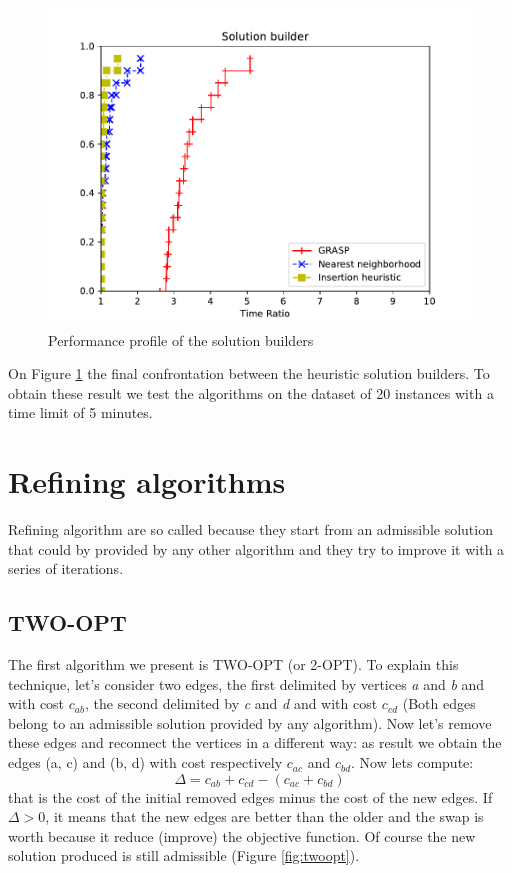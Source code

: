 \begin{figure}[h!]
	\centering
	\includegraphics[scale=0.8]{media/builder.pdf}
	\caption{Performance profile of the solution builders}
	\label{fig:solbuilder}
\end{figure}
\noindent
On Figure \ref{fig:solbuilder} the final confrontation between the heuristic solution builders. To obtain these result we test the algorithms on the dataset of 20 instances with a time limit of 5 minutes. 

\clearpage

\section{Refining algorithms}
Refining algorithm are so called because they start from an admissible solution that could by provided by any other algorithm and they try to improve it with a series of iterations.

\subsection{TWO-OPT}
\label{two-opt}
The first algorithm we present is TWO-OPT (or 2-OPT). To explain this technique, let's consider two edges, the first delimited by vertices \textit{a} and \textit{b} and with cost $c_{ab}$, the second delimited by \textit{c} and \textit{d} and with cost $c_{cd}$ (Both edges belong to an admissible solution provided by any algorithm). Now let's remove these edges and reconnect the vertices in a different way: as result we obtain the edges (a, c) and (b, d) with cost respectively $c_{ac}$ and $c_{bd}$. Now lets compute: 
\begin{equation*}
\Delta = c_{ab} + c_{cd} - (c_{ac} + c_{bd})
\end{equation*}
that is the cost of the initial removed edges minus the cost of the new edges. If $\Delta > 0$, it means that the new edges are better than the older and the swap is worth because it reduce (improve) the objective function. Of course the new solution produced is still admissible (Figure \ref{fig:twoopt}).\\

